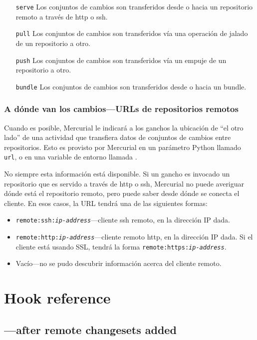 \begin{itemize}
\item[\texttt{serve}] Los conjuntos de cambios son transferidos desde
  o hacia un repositorio remoto a través de http o ssh.
\item[\texttt{pull}] Los conjuntos de cambios son transferidos vía una
  operación de jalado de un repositorio a otro.
\item[\texttt{push}] Los conjuntos de cambios son transferidos vía un
  empuje de un repositorio a otro.
\item[\texttt{bundle}] Los conjuntos de cambios son transferidos desde
  o hacia un bundle.
\end{itemize}

\subsubsection{A dónde van los cambios---URLs de repositorios remotos}
\label{sec:hook:url}

Cuando es posible, Mercurial le indicará a los ganchos la ubicación de
``el otro lado'' de una actividad que transfiera datos de conjuntos de
cambios entre repositorios. Esto es provisto por Mercurial en un
parámetro Python llamado \texttt{url}, o en una variable de entorno
llamada .

No siempre esta información está disponible. Si un gancho es invocado
un repositorio que es servido a través de http o ssh, Mercurial no
puede averiguar dónde está el repositorio remoto, pero puede saber
desde dónde se conecta el cliente. En esos casos, la URL tendrá una de
las siguientes formas:
\begin{itemize}
\item \texttt{remote:ssh:\emph{ip-address}}---cliente ssh remoto, en
  la dirección IP dada.
\item \texttt{remote:http:\emph{ip-address}}---cliente remoto http, en
  la dirección IP dada. Si el cliente está usando SSL, tendrá la forma
  \texttt{remote:https:\emph{ip-address}}.
\item Vacío---no se pudo descubrir información acerca del cliente
  remoto.
\end{itemize}

\section{Hook reference}

\subsection{---after remote changesets added}
\label{sec:hook:changegroup}

